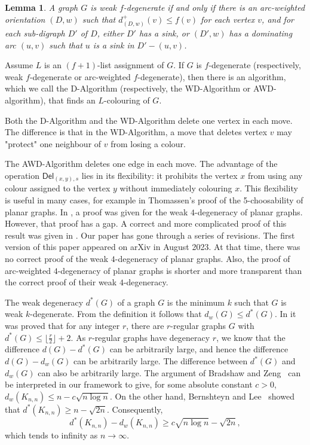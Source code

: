 \documentclass[11pt,a4paper]{article}
\newtheorem{lem}{Lemma}
\theoremstyle{definition}
\newcommand{\ed}{\textsf{Del}}
\begin{document}
\begin{lem}
    \label{lem-weak}
    A graph $G$ is weak  $f$-degenerate if and only if there is an arc-weighted orientation $(D,w)$ such that $d_{(D,w)}^+(v) \le f(v)$ for each vertex $v$, and for each  sub-digraph $D'$ of $D$,  either $D'$ has a sink, or $(D', w)$ has a dominating arc $(u,v)$ such that $u$ is a sink in $D'-(u,v)$. 
\end{lem}

Assume $L$ is an $(f+1)$-list assignment of $G$.  If $G$ is $f$-degenerate (respectively, weak $f$-degenerate or arc-weighted $f$-degenerate), then there is an algorithm, which we call the D-Algorithm (respectively, the WD-Algorithm or AWD-algorithm), that finds an $L$-colouring of $G$.    

 
Both the D-Algorithm and the WD-Algorithm delete  one vertex in each move. The difference is that in the WD-Algorithm, a move that deletes vertex $v$ may "protect" one neighbour of $v$ from losing a colour. 
  
  The AWD-Algorithm  deletes one edge in each move. 
The advantage of the  operation $\ed_{(x,y),s}$ lies in its flexibility: it prohibits the vertex $x$ from using any colour assigned to the vertex $y$ without immediately colouring $x$. 
This flexibility is  useful in many cases, for example in Thomassen's proof of the 5-choosability of planar graphs. In \cite{BL}, a proof was given for the weak $4$-degeneracy of planar graphs. However, that proof has a gap. A correct and more complicated proof of this result was given in \cite{BLS2024}. Our paper has gone through a series of revisions. The first version of this paper appeared on arXiv in August 2023. At that time, there was no correct proof of the weak $4$-degeneracy of planar graphs. Also, the proof of arc-weighted $4$-degeneracy of planar graphs is   shorter and more transparent than the correct proof of their weak $4$-degeneracy. 

 

The weak  degeneracy $d^*(G)$  of a graph $G$ is the minimum $k$ such that $G$ is weak   $k$-degenerate. From the definition it follows that $ d_{w}(G) \le d^*(G) $. In \cite{Yang} it was proved that for any integer $r$, there are $r$-regular graphs $G$ with $d^*(G) \le \lfloor \frac r2 \rfloor + 2$. As $r$-regular graphs have  degeneracy $r$, we know that the difference $d(G)- d^*(G)$ can be arbitrarily large, and hence the difference 
$d(G)-d_{w}(G) $ can be arbitrarily large.  The difference between $d^*(G)$ and $d_w(G)$ can also be arbitrarily large. The argument of Bradshaw and Zeng~\cite{BZ25} can be interpreted in our framework to give, for some absolute constant $c>0$, $d_w(K_{n,n}) \le n-c\sqrt{n\log n}$. On the other hand, Bernshteyn and Lee~\cite{BL} showed that
$d^*(K_{n,n}) \ge n-\sqrt{2n}$. Consequently, $$d^*(K_{n,n})-d_w(K_{n,n})
\ge c\sqrt{n\log n}-\sqrt{2n},$$
 which tends to infinity as $n\to\infty$. 
\end{document}
